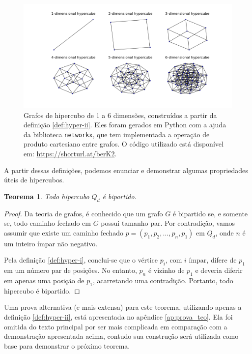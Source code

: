 \documentclass[12pt, a4paper]{article}
\newtheorem{theorem}{Teorema}[section]
\begin{document}
\begin{figure}[h]
    \centering
    \includegraphics[width=0.95\linewidth]{figs/hypercube_examples.png}
    \caption{Grafos de hipercubo de 1 a 6 dimensões, construídos a partir da definição \ref{def:hyper-ii}. Eles foram gerados em Python com a ajuda da biblioteca \texttt{networkx}, que tem implementada a operação de produto cartesiano entre grafos. O código utilizado está disponível em: \url{https://shorturl.at/berK2}.}
    \label{fig:hypercubes}
\end{figure}

A partir dessas definições, podemos enunciar e demonstrar algumas propriedades úteis de hipercubos.

\begin{theorem}\label{teo:bipart}
    Todo hipercubo $Q_d$ é bipartido.
\end{theorem}

\begin{proof}
    Da teoria de grafos, é conhecido que um grafo $G$ é bipartido se, e somente se, todo caminho fechado em $G$ possui tamanho par. Por contradição, vamos assumir que existe um caminho fechado $p = (p_1, p_2, \dots, p_n, p_1)$ em $Q_d$, onde $n$ é um inteiro ímpar não negativo.
    
    Pela definição \ref{def:hyper-i}, conclui-se que o vértice $p_i$, com $i$ ímpar, difere de $p_1$ em um número par de posições. No entanto, $p_n$ é vizinho de $p_1$ e deveria diferir em apenas uma posição de $p_1$, acarretando uma contradição. Portanto, todo hipercubo é bipartido.
\end{proof}

Uma prova alternativa (e mais extensa) para este teorema, utilizando apenas a definição \ref{def:hyper-ii}, está apresentada no apêndice \ref{ap:prova_teo}. Ela foi omitida do texto principal por ser mais complicada em comparação com a demonstração apresentada acima, contudo sua construção será utilizada como base para demonstrar o próximo teorema.
\end{document}
